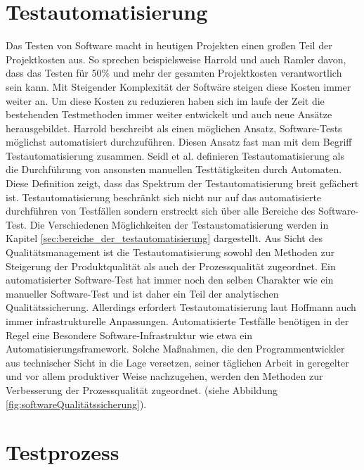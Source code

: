 \section{Testautomatisierung}
\label{sec:testautoGrundlagen}
Das Testen von Software macht in heutigen Projekten einen großen Teil der Projektkosten aus. So sprechen beispielsweise Harrold \cite{harrold_testing:_2000} und auch Ramler \cite{ramler_economic_2006} davon, dass das Testen für 50\% 
und mehr der gesamten Projektkosten verantwortlich sein kann. 
Mit Steigender Komplexität der Softwäre steigen diese Kosten immer weiter an.  
Um diese Kosten zu reduzieren haben sich im laufe der Zeit die bestehenden Testmethoden immer weiter entwickelt und auch neue Ansätze herausgebildet. Harrold \cite{harrold_testing:_2000} beschreibt als einen möglichen Ansatz, Software-Tests möglichst automatisiert durchzuführen. Diesen Ansatz fast man mit dem Begriff Testautomatisierung zusammen.
Seidl et al. \cite[S.7]{seidl_basiswissen_2012} definieren Testautomatisierung als \glqq die Durchführung von ansonsten manuellen Testtätigkeiten durch Automaten.\grqq
Diese Definition zeigt, dass das Spektrum der Testautomatisierung breit gefächert ist. Testautomatisierung beschränkt sich nicht nur auf das automatisierte durchführen von Testfällen sondern erstreckt sich über alle Bereiche des Software-Test. Die Verschiedenen Möglichkeiten der Testaustomatisierung werden in Kapitel \ref{sec:bereiche_der_testautomatisierung} dargestellt.
Aus Sicht des Qualitätsmanagement ist die Testautomatisierung sowohl den Methoden zur Steigerung der Produktqualität als auch der Prozessqualität zugeordnet. Ein automatisierter Software-Test hat immer noch den selben Charakter wie ein manueller Software-Test und ist daher ein Teil der analytischen Qualitätssicherung. Allerdings erfordert Testautomatisierung laut Hoffmann \cite[vgl. Seite 25]{hoffmann_software-qualitat_2013} auch immer infrastrukturelle Anpassungen. Automatisierte Testfälle benötigen in der Regel eine Besondere Software-Infrastruktur wie etwa ein Automatisierungsframework. Solche Maßnahmen, die den Programmentwickler aus technischer Sicht in die Lage versetzen, seiner täglichen Arbeit in geregelter und vor allem produktiver Weise nachzugehen, werden den Methoden zur Verbesserung der Prozessqualität zugeordnet. (siehe Abbildung \ref{fig:softwareQualitätssicherung}).



\section{Testprozess}
\label{sec:testprozess}

